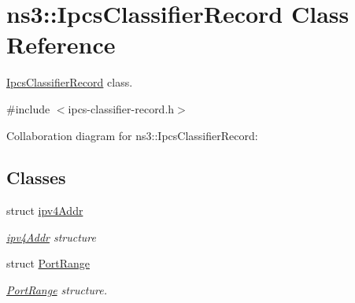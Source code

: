 \hypertarget{classns3_1_1IpcsClassifierRecord}{}\section{ns3\+:\+:Ipcs\+Classifier\+Record Class Reference}
\label{classns3_1_1IpcsClassifierRecord}


\hyperlink{classns3_1_1IpcsClassifierRecord}{Ipcs\+Classifier\+Record} class.  




{\ttfamily \#include $<$ipcs-\/classifier-\/record.\+h$>$}



Collaboration diagram for ns3\+:\+:Ipcs\+Classifier\+Record\+:
\subsection*{Classes}
\begin{DoxyCompactItemize}
\item 
struct \hyperlink{structns3_1_1IpcsClassifierRecord_1_1ipv4Addr}{ipv4\+Addr}
\begin{DoxyCompactList}\small\item\em \hyperlink{structns3_1_1IpcsClassifierRecord_1_1ipv4Addr}{ipv4\+Addr} structure \end{DoxyCompactList}\item 
struct \hyperlink{structns3_1_1IpcsClassifierRecord_1_1PortRange}{Port\+Range}
\begin{DoxyCompactList}\small\item\em \hyperlink{structns3_1_1IpcsClassifierRecord_1_1PortRange}{Port\+Range} structure. \end{DoxyCompactList}\end{DoxyCompactItemize}
